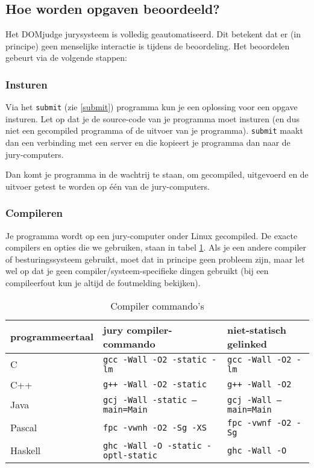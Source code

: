 \documentclass[11pt,titlepage,a4paper]{article}
\newcommand{\DOMjudge}{DOMjudge }
\begin{document}
\subsection{Hoe worden opgaven beoordeeld?}

Het \DOMjudge jurysysteem is volledig geautomatiseerd. Dit betekent
dat er (in principe) geen menselijke interactie is tijdens de
beoordeling. Het beoordelen gebeurt via de volgende stappen:

\subsubsection{Insturen}

Via het \texttt{submit} (zie \ref{submit}) programma kun je een
oplossing voor een opgave insturen. Let op dat je de source-code van
je programma moet insturen (en dus niet een gecompiled programma of de
uitvoer van je programma). \texttt{submit} maakt dan een verbinding
met een server en die kopieert je programma dan naar de
jury-computers.

Dan komt je programma in de wachtrij te staan, om gecompiled,
uitgevoerd en de uitvoer getest te worden op \'e\'en van de
jury-computers.

\subsubsection{Compileren}

Je programma wordt op een jury-computer onder Linux gecompiled. De
exacte compilers en opties die we gebruiken, staan in tabel
\ref{compilercommandos}. Als je een andere compiler of besturingssysteem
gebruikt, moet dat in principe geen probleem zijn, maar let wel op dat
je geen compiler/systeem-specifieke dingen gebruikt (bij een
compileerfout kun je altijd de foutmelding bekijken).

\begin{table}[!ht]
\caption{Compiler commando's}
\begin{tabular}{|l|l|l|}
\hline
programmeertaal & jury compiler-commando & niet-statisch gelinked \\
\hline
C		& \texttt{gcc -Wall -O2 -static -lm}		& \texttt{gcc -Wall -O2 -lm}\\
C++		& \texttt{g++ -Wall -O2 -static}			& \texttt{g++ -Wall -O2}\\
Java	& \texttt{gcj -Wall -static --main=Main}	& \texttt{gcj -Wall --main=Main}\\
Pascal	& \texttt{fpc -vwnh -O2 -Sg -XS}			& \texttt{fpc -vwnf -O2 -Sg}\\
Haskell	& \texttt{ghc -Wall -O -static -optl-static}& \texttt{ghc -Wall -O}\\
\hline
\end{tabular}
\label{compilercommandos}
\end{table}
\end{document}

